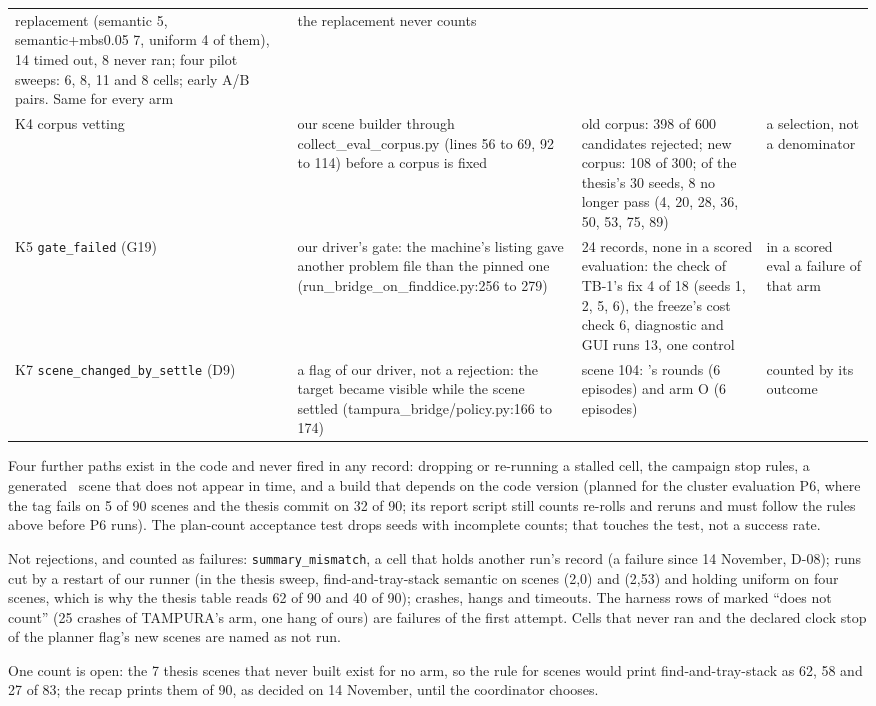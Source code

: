\begin{footnotesize}
\begin{longtable}{@{}P{2.3cm}P{3.0cm}P{6.0cm}P{1.6cm}@{}}
replacement (semantic 5, semantic+mbs0.05 7, uniform 4 of them), 14 timed out, 8 never
ran; four pilot sweeps: 6, 8, 11 and 8 cells; early A/B pairs. Same for every arm &
the replacement never counts \\
K4 corpus vetting &
our scene builder through collect\_eval\_corpus.py (lines 56 to 69, 92 to 114) before a corpus
is fixed &
old corpus: 398 of 600 candidates rejected; new corpus: 108 of 300; of the thesis's 30
seeds, 8 no longer pass (4, 20, 28, 36, 50, 53, 75, 89) &
a selection, not a denominator \\
K5 \texttt{gate\_failed} (G19) &
our driver's gate: the machine's listing gave another problem file than the pinned one
(run\_bridge\_on\_finddice.py:256 to 279) &
24 records, none in a scored evaluation: the check of TB-1's fix 4 of 18 (seeds 1, 2, 5,
6), the freeze's cost check 6, diagnostic and GUI runs 13, one control &
in a scored eval a failure of that arm \\
K7 \texttt{scene\_\allowbreak changed\_\allowbreak by\_\allowbreak settle} (D9) &
a flag of our driver, not a rejection: the target became visible while the scene
settled (tampura\_bridge/policy.py:166 to 174) &
scene 104: 's rounds (6 episodes) and  arm O (6 episodes) &
counted by its outcome \\
\end{longtable}
\end{footnotesize}

Four further paths exist in the code and never fired in any record: dropping or
re-running a stalled cell, the campaign stop rules, a generated \fdice\ scene that does
not appear in time, and a build that depends on the code version (planned for the
cluster evaluation P6, where the tag fails on 5 of 90 scenes and the thesis commit on 32
of 90; its report script still counts re-rolls and reruns and must follow the rules
above before P6 runs). The plan-count acceptance test drops seeds with incomplete
counts; that touches the test, not a success rate.

Not rejections, and counted as failures: \texttt{summary\_mismatch}, a cell that holds
another run's record (a failure since 14 November, D-08); runs cut by a restart of our
runner (in the thesis sweep, find-and-tray-stack semantic on scenes (2,0) and (2,53) and
holding uniform on four scenes, which is why the thesis table reads 62 of 90 and 40 of
90); crashes, hangs and timeouts. The harness rows of  marked ``does not count''
(25 crashes of TAMPURA's arm, one hang of ours) are failures of the first attempt.
Cells that never ran and the declared clock stop of the planner flag's new scenes are
named as not run.

One count is open: the 7 thesis scenes that never built exist for no arm, so the rule
for scenes would print find-and-tray-stack as 62, 58 and 27 of 83; the recap prints them
of 90, as decided on 14 November, until the coordinator chooses.